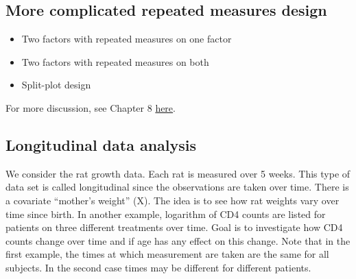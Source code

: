 \documentclass[12pt,]{book}
\providecommand{\tightlist}{%
  \setlength{\itemsep}{0pt}\setlength{\parskip}{0pt}}
\begin{document}
\subsection{More complicated repeated measures
design}\label{more-complicated-repeated-measures-design}

\begin{itemize}
\tightlist
\item
  Two factors with repeated measures on one factor
\item
  Two factors with repeated measures on both
\item
  Split-plot design
\end{itemize}

For more discussion, see Chapter 8
\href{https://stat.ethz.ch/~meier/teaching/anova/split-plot-designs.html\#}{here}.

\subsection{Longitudinal data
analysis}\label{longitudinal-data-analysis}

We consider the rat growth data. Each rat is measured over 5 weeks. This
type of data set is called longitudinal since the observations are taken
over time. There is a covariate ``mother's weight'' (X). The idea is to
see how rat weights vary over time since birth. In another example,
logarithm of CD4 counts are listed for patients on three different
treatments over time. Goal is to investigate how CD4 counts change over
time and if age has any effect on this change. Note that in the first
example, the times at which measurement are taken are the same for all
subjects. In the second case times may be different for different
patients.
\end{document}
